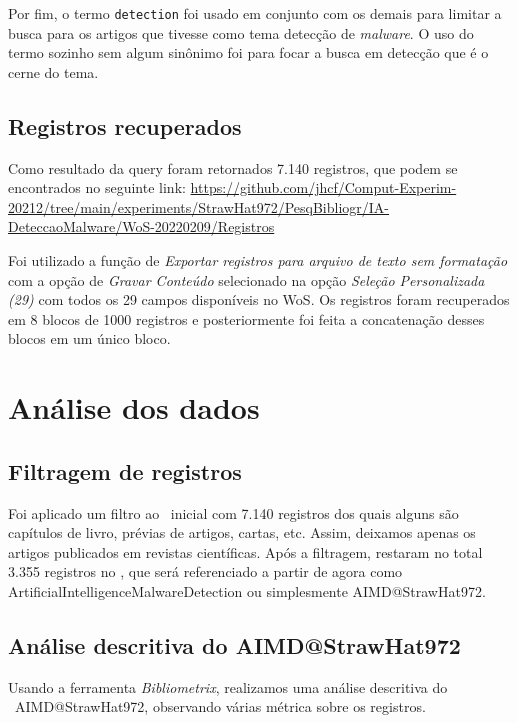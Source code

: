 Por fim, o termo \texttt{detection} foi usado em conjunto com os demais para limitar a busca para os artigos que tivesse como tema detecção de \textit{malware}. O uso do termo sozinho sem algum sinônimo foi para focar a busca em detecção que é o cerne do tema.

\subsection{Registros recuperados}

Como resultado da query foram retornados 7.140 registros, que podem se encontrados no seguinte link: \url{https://github.com/jhcf/Comput-Experim-20212/tree/main/experiments/StrawHat972/PesqBibliogr/IA-DeteccaoMalware/WoS-20220209/Registros}

Foi utilizado a função de \textit{Exportar registros para arquivo de texto sem formatação} com a opção de \textit{Gravar Conteúdo} selecionado na opção \textit{Seleção Personalizada (29)} com todos os 29 campos disponíveis no WoS. Os registros foram recuperados em 8 blocos de 1000 registros e posteriormente foi feita a concatenação desses blocos em um único bloco.

\section{Análise dos dados}

\subsection{Filtragem de registros}

Foi aplicado um filtro ao \dataset\ inicial com 7.140 registros dos quais alguns são capítulos de livro, prévias de artigos, cartas, etc. Assim, deixamos apenas os artigos publicados em revistas científicas. Após a filtragem, restaram no total 3.355 registros no \dataset, que será referenciado a partir de agora como ArtificialIntelligenceMalwareDetection ou simplesmente AIMD@StrawHat972.

\subsection{ Análise descritiva do \dataset AIMD@StrawHat972}

Usando a ferramenta \textit{Bibliometrix}, realizamos uma análise descritiva do \dataset\ AIMD@StrawHat972, observando várias métrica sobre os registros.

